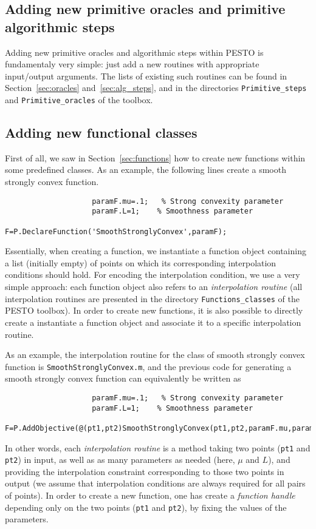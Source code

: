 \documentclass[11pt,a4paper]{article}
\begin{document}
					\subsection{Adding new primitive oracles and primitive algorithmic steps}
					
					Adding new primitive oracles and algorithmic steps within PESTO is fundamentaly very simple: just add a new routines with appropriate input/output arguments. The lists of existing such routines can be found in Section~\ref{sec:oracles} and~\ref{sec:alg_steps}, and in the directories \verb?Primitive_steps? and \verb?Primitive_oracles? of the toolbox. 
					\subsection{Adding new functional classes}
					First of all, we saw in Section~\ref{sec:functions} how to create new functions within some predefined classes. As an example, the following lines create a smooth strongly convex function.\\[-1cm]
					\begin{lstlisting}
					paramF.mu=.1;	% Strong convexity parameter
					paramF.L=1;    % Smoothness parameter
					F=P.DeclareFunction('SmoothStronglyConvex',paramF);
					\end{lstlisting}
					Essentially, when creating a function, we instantiate a function object containing a list (initially empty) of points on which its corresponding interpolation conditions should hold. For encoding the interpolation condition, we use a very simple approach: each function object also refers to an \emph{interpolation routine} (all interpolation routines are presented in the directory \verb?Functions_classes? of the PESTO toolbox). 
					In order to create new functions, it is also possible to directly create a instantiate a function object and associate it to a specific interpolation routine.
					
					As an example, the interpolation routine for the class of smooth strongly convex function is \verb?SmoothStronglyConvex.m?, and the previous code for generating a smooth strongly convex function can equivalently be written as\\[-1cm]
					\begin{lstlisting}
					paramF.mu=.1;	% Strong convexity parameter
					paramF.L=1;    % Smoothness parameter
					F=P.AddObjective(@(pt1,pt2)SmoothStronglyConvex(pt1,pt2,paramF.mu,paramF.L));
					\end{lstlisting}
					In other words, each \emph{interpolation routine} is a method taking two points (\verb?pt1? and \verb?pt2?) in input, as well as as many parameters as needed (here, $\mu$ and $L$), and providing the interpolation constraint corresponding to those two points in output (we assume that interpolation conditions are always required for all pairs of points). In order to create a new function, one has create a \emph{function handle} depending only on the two points (\verb?pt1? and \verb?pt2?), by fixing the values of the parameters.
					
\end{document}
